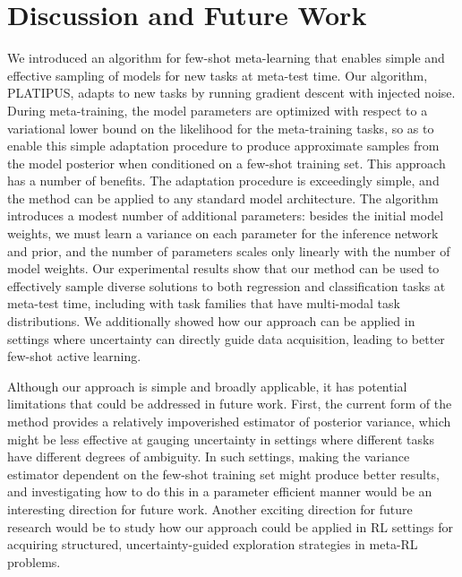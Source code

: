 \documentclass{article}
\begin{document}
\vspace{-0.4cm}
\section{Discussion and Future Work}
\label{sec:conclusion}
\vspace{-0.3cm}

We introduced an algorithm for few-shot meta-learning that enables simple and effective sampling of models for new tasks at meta-test time. Our algorithm, PLATIPUS, adapts to new tasks by running gradient descent with injected noise. During meta-training, the model parameters are optimized with respect to a variational lower bound on the likelihood for the meta-training tasks, so as to enable this simple adaptation procedure to produce approximate samples from the model posterior when conditioned on a few-shot training set. This approach has a number of benefits. The adaptation procedure is exceedingly simple, and the method can be applied to any standard model architecture. The algorithm introduces a modest number of additional parameters: besides the initial model weights, we must learn a variance on each parameter for the inference network and prior, and the number of parameters scales only linearly with the number of model weights. Our experimental results show that our method can be used to effectively sample diverse solutions to both regression and classification tasks at meta-test time, including with task families that have multi-modal task distributions. We additionally showed how our approach can be applied in settings where uncertainty can directly guide data acquisition, leading to better few-shot active learning.

Although our approach is simple and broadly applicable, it has potential limitations that could be addressed in future work. First, the current form of the method provides a relatively impoverished estimator of posterior variance, which might be less effective at gauging uncertainty in settings where different tasks have different degrees of ambiguity. In such settings, making the variance estimator dependent on the few-shot training set might produce better results, and investigating how to do this in a parameter efficient manner would be an interesting direction for future work.
Another exciting direction for future research would be to study how our approach could be applied in RL settings for acquiring structured, uncertainty-guided exploration strategies in meta-RL problems.
\end{document}
